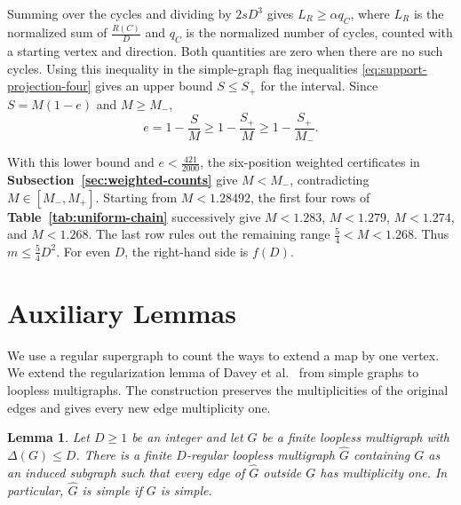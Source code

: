 \documentclass[preprint,11pt,numbers]{elsarticle-arxiv}
\numberwithin{equation}{section}
\newtheorem{lemma}[theorem]{Lemma}
\theoremstyle{definition}
\begin{document}
Summing over the cycles and dividing by $2sD^3$ gives
$L_R\geq\alpha q_C$, where $L_R$ is the normalized sum of
$\frac{R(C)}{D}$ and $q_C$ is the normalized number of cycles,
counted with a starting vertex and direction. Both quantities
are zero when there are no such cycles. Using this inequality in
the simple-graph flag inequalities \eqref{eq:support-projection-four}
gives an upper bound $S\leq S_+$ for the interval. Since
$S=M(1-e)$ and $M\geq M_-$,
\[
 e=1-\frac{S}{M}
 \geq 1-\frac{S_+}{M}
 \geq 1-\frac{S_+}{M_-}.
\]

With this lower bound and $e<\frac{421}{2000}$, the six-position
weighted certificates in \textbf{Subsection~\ref{sec:weighted-counts}}
give $M<M_-$, contradicting $M\in[M_-,M_+]$. Starting from
$M<1.28492$, the first four rows of
\textbf{Table~\ref{tab:uniform-chain}} successively give $M<1.283$,
$M<1.279$, $M<1.274$, and $M<1.268$. The last row rules out the
remaining range $\frac{5}{4}<M<1.268$. Thus $m\leq\frac{5}{4}D^2$.
For even $D$, the right-hand side is $f(D)$.

\section{Auxiliary Lemmas}\label{sec:auxiliary}

We use a regular supergraph to count the ways to extend a map by one
vertex. We extend the regularization lemma of Davey et
al.~\cite{DaveyEtAlStrong2026} from simple graphs to
loopless multigraphs. The construction preserves the multiplicities
of the original edges and gives every new edge multiplicity one.

\begin{lemma}\label{lem:regularization}
Let $D\geq1$ be an integer and let $G$ be a finite loopless multigraph
with $\Delta(G)\leq D$. There is a finite $D$-regular loopless multigraph
$\widehat G$ containing $G$ as an induced subgraph such that every
edge of $\widehat G$ outside $G$ has multiplicity one. In particular, $\widehat G$ is simple
if $G$ is simple.
\end{lemma}
\end{document}
